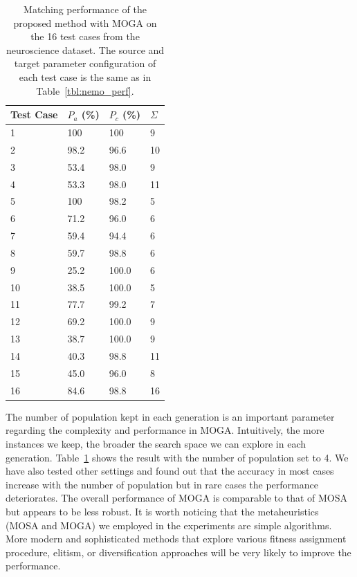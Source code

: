 \begin{table}[tbh]
\begin{center}
\begin{tabular}{l|l|l|l}
\hline
Test Case	&	$P_a$ (\%)	&	$P_c$ (\%) &   $\Sigma$    \\
\hline
1	&	100	&	100	  &   9\\
2	&	98.2	&	96.6	&   10\\
3	&	53.4	&	98.0	 &  9\\
4	&	53.3	&	98.0	&   11\\
5	&	100	&	98.2	&    5\\
6	&	71.2	&	96.0	&   6\\
7	&	59.4	&	94.4	&   6\\
8	&	59.7	&	98.8	&   6\\
9	&	25.2	&	100.0	&6 \\
10	&	38.5	&	100.0	& 5\\
11	&	77.7	&	99.2	&  7\\
12	&	69.2	&	100.0	& 9\\
13	&	38.7	&	100.0	& 9\\
14	&	40.3	&	98.8	&  11\\
15	&	45.0	&	96.0	&  8\\
16	&	84.6	&	98.8	&  16\\
\hline
\end{tabular}
\end{center}
\caption[The performance of MOGA on the neuroscience dataset]{\label{tbl:moga_neuro} Matching performance of the proposed method with MOGA on the 16 test cases from the neuroscience dataset. The source and target parameter configuration of each test case is the same as in Table~\ref{tbl:nemo_perf}.}
\end{table}

The number of population kept in each generation is an important parameter regarding the complexity and performance in MOGA. Intuitively, the more instances we keep, the broader the search space we can explore in each generation. Table~\ref{tbl:moga_neuro} shows the result with the number of population set to 4. We have also tested other settings and found out that the accuracy in most cases increase with the number of population but in rare cases the performance deteriorates. The overall performance of MOGA is comparable to that of MOSA but appears to be less robust. It is worth noticing that the metaheuristics (MOSA and MOGA) we employed in the experiments are simple algorithms. More modern and sophisticated methods that explore various fitness assignment procedure, elitism, or diversification approaches will be very likely to improve the performance.


